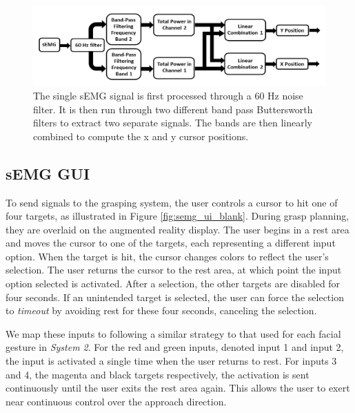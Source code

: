 \begin{figure}
\centering
\includegraphics[width=.99\columnwidth]{semg_processing_pipeline.png}
\caption{The single sEMG signal is first processed through a 60 Hz noise filter. It is then run through two different band pass Buttersworth filters to extract two separate signals. The bands are then linearly combined to compute the x and y cursor positions.}
\label{fig:semg_processing_pipeline}
\end{figure}

\subsection{sEMG GUI}
To send signals to the grasping system, the user controls a cursor to hit one of four targets, as illustrated in Figure \ref{fig:semg_ui_blank}. During grasp planning, they are overlaid on the augmented reality display. The user begins in a rest area and moves the cursor to one of the targets, each representing a different input option. When the target is hit, the cursor changes colors to reflect the user's selection. The user returns the cursor to the rest area, at which point the input option selected is activated. After a selection, the other targets are disabled for four seconds. If an unintended target is selected, the user can force the selection to \emph{timeout} by avoiding rest for these four seconds, canceling the selection. 

We map these inputs to following a similar strategy to that used for each facial gesture in \emph{System 2}. For the red and green inputs, denoted input 1 and input 2, the input is activated a single time when the user returns to rest. For inputs 3 and 4, the magenta and black targets respectively, the activation is sent continuously until the user exits the rest area again. This allows the user to exert near continuous control over the approach direction. 


